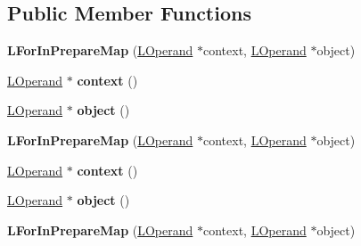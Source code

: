 \subsection*{Public Member Functions}
\begin{DoxyCompactItemize}
\item 
{\bfseries L\+For\+In\+Prepare\+Map} (\hyperlink{classv8_1_1internal_1_1_l_operand}{L\+Operand} $\ast$context, \hyperlink{classv8_1_1internal_1_1_l_operand}{L\+Operand} $\ast$object)\hypertarget{classv8_1_1internal_1_1_l_for_in_prepare_map_a385cae813e246c3beeb67db5bbc83379}{}\label{classv8_1_1internal_1_1_l_for_in_prepare_map_a385cae813e246c3beeb67db5bbc83379}

\item 
\hyperlink{classv8_1_1internal_1_1_l_operand}{L\+Operand} $\ast$ {\bfseries context} ()\hypertarget{classv8_1_1internal_1_1_l_for_in_prepare_map_a2e3211c97e0ee0b7c5b1dc6c352c7768}{}\label{classv8_1_1internal_1_1_l_for_in_prepare_map_a2e3211c97e0ee0b7c5b1dc6c352c7768}

\item 
\hyperlink{classv8_1_1internal_1_1_l_operand}{L\+Operand} $\ast$ {\bfseries object} ()\hypertarget{classv8_1_1internal_1_1_l_for_in_prepare_map_aec0b2c5f56f128c747e1c8e7f2bd6b4d}{}\label{classv8_1_1internal_1_1_l_for_in_prepare_map_aec0b2c5f56f128c747e1c8e7f2bd6b4d}

\item 
{\bfseries L\+For\+In\+Prepare\+Map} (\hyperlink{classv8_1_1internal_1_1_l_operand}{L\+Operand} $\ast$context, \hyperlink{classv8_1_1internal_1_1_l_operand}{L\+Operand} $\ast$object)\hypertarget{classv8_1_1internal_1_1_l_for_in_prepare_map_a385cae813e246c3beeb67db5bbc83379}{}\label{classv8_1_1internal_1_1_l_for_in_prepare_map_a385cae813e246c3beeb67db5bbc83379}

\item 
\hyperlink{classv8_1_1internal_1_1_l_operand}{L\+Operand} $\ast$ {\bfseries context} ()\hypertarget{classv8_1_1internal_1_1_l_for_in_prepare_map_a2e3211c97e0ee0b7c5b1dc6c352c7768}{}\label{classv8_1_1internal_1_1_l_for_in_prepare_map_a2e3211c97e0ee0b7c5b1dc6c352c7768}

\item 
\hyperlink{classv8_1_1internal_1_1_l_operand}{L\+Operand} $\ast$ {\bfseries object} ()\hypertarget{classv8_1_1internal_1_1_l_for_in_prepare_map_aec0b2c5f56f128c747e1c8e7f2bd6b4d}{}\label{classv8_1_1internal_1_1_l_for_in_prepare_map_aec0b2c5f56f128c747e1c8e7f2bd6b4d}

\item 
{\bfseries L\+For\+In\+Prepare\+Map} (\hyperlink{classv8_1_1internal_1_1_l_operand}{L\+Operand} $\ast$context, \hyperlink{classv8_1_1internal_1_1_l_operand}{L\+Operand} $\ast$object)\hypertarget{classv8_1_1internal_1_1_l_for_in_prepare_map_a385cae813e246c3beeb67db5bbc83379}{}\label{classv8_1_1internal_1_1_l_for_in_prepare_map_a385cae813e246c3beeb67db5bbc83379}


\end{DoxyCompactItemize}
